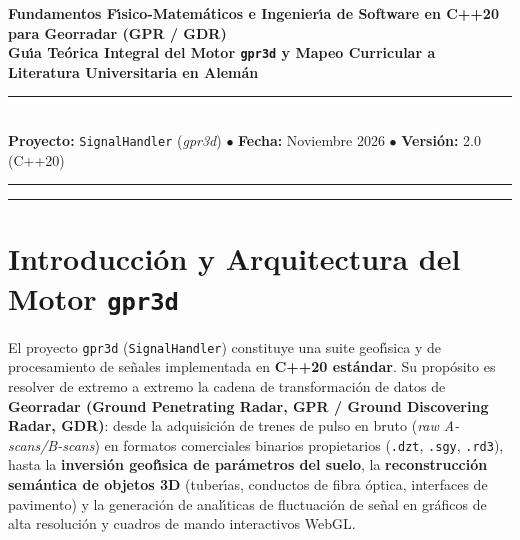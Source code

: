 \documentclass[11pt,a4paper]{article}
\begin{document}
\begin{center}
    {\LARGE \textbf{Fundamentos F{\'\i}sico-Matem{\'a}ticos e Ingenier{\'\i}a de Software en C++20 para Georradar (GPR / GDR)}}\\[0.4cm]
    {\Large \textbf{Gu{\'\i}a Te{\'o}rica Integral del Motor \texttt{gpr3d} y Mapeo Curricular a Literatura Universitaria en Alem{\'a}n}}\\[0.3cm]
    \rule{\textwidth}{1.2pt}\\[0.2cm]
    \textbf{Proyecto:} \texttt{SignalHandler} (\textit{gpr3d}) \quad $\bullet$ \quad \textbf{Fecha:} Noviembre 2026 \quad $\bullet$ \quad \textbf{Versi{\'o}n:} 2.0 (C++20)\\
    \rule{\textwidth}{0.6pt}
\end{center}

\vspace{0.2cm}

\tableofcontents

\vspace{0.5cm}
\hrule
\vspace{0.5cm}

\section{Introducci{\'o}n y Arquitectura del Motor \texttt{gpr3d}}

El proyecto \texttt{gpr3d} (\texttt{SignalHandler}) constituye una suite geof{\'\i}sica y de procesamiento de se{\~n}ales implementada en \textbf{C++20 est{\'a}ndar}. Su prop{\'o}sito es resolver de extremo a extremo la cadena de transformaci{\'o}n de datos de \textbf{Georradar (Ground Penetrating Radar, GPR / Ground Discovering Radar, GDR)}: desde la adquisici{\'o}n de trenes de pulso en bruto (\textit{raw A-scans/B-scans}) en formatos comerciales binarios propietarios (\texttt{.dzt}, \texttt{.sgy}, \texttt{.rd3}), hasta la \textbf{inversi{\'o}n geof{\'\i}sica de par{\'a}metros del suelo}, la \textbf{reconstrucci{\'o}n sem{\'a}ntica de objetos 3D} (tuber{\'\i}as, conductos de fibra {\'o}ptica, interfaces de pavimento) y la generaci{\'o}n de anal{\'\i}ticas de fluctuaci{\'o}n de se{\~n}al en gr{\'a}ficos de alta resoluci{\'o}n y cuadros de mando interactivos WebGL.
\end{document}

